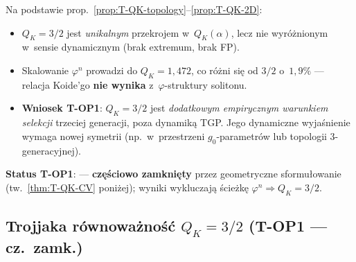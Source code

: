 \begin{corollary}[T-OP1: $Q_K = 3/2$ nie jest FP TGP]%
\label{cor:T-OP1-result}
Na podstawie prop.~\ref{prop:T-QK-topology}--\ref{prop:T-QK-2D}:
\begin{itemize}[nosep]
  \item $Q_K = 3/2$ jest \emph{unikalnym} przekrojem w~$Q_K(\alpha)$,
    lecz nie wyró\.znionym w~sensie dynamicznym (brak extremum, brak FP).
  \item Skalowanie $\varphi^n$ prowadzi do $Q_K = 1{,}472$,
    co r\'o\.zni si\k{e} od $3/2$ o~$1{,}9\%$ --- relacja Koide'go
    \textbf{nie wynika} z~$\varphi$-struktury solitonu.
  \item \textbf{Wniosek T-OP1}: $Q_K = 3/2$ jest \emph{dodatkowym
    empirycznym warunkiem selekcji} trzeciej generacji,
    poza dynamik\k{a} TGP.
    Jego dynamiczne wyja\'snienie wymaga nowej symetrii
    (np.\ w~przestrzeni $g_0$-parametr\'ow lub topologii 3-generacyjnej).
\end{itemize}
\textbf{Status T-OP1}:  ---
\textbf{cz\k{e}\'sciowo zamkni\k{e}ty} przez geometryczne sformu\l{}owanie
(tw.~\ref{thm:T-QK-CV} poni\.zej);
wyniki wykluczaj\k{a} \'scie\.zk\k{e}
$\varphi^n \Rightarrow Q_K = 3/2$.
\end{corollary}

\subsection{Trojjaka r\'ownowa\.zno\'s\'c $Q_K = 3/2$ (T-OP1 --- cz.~zamk.)}%
\label{app:T-triple-equiv}

